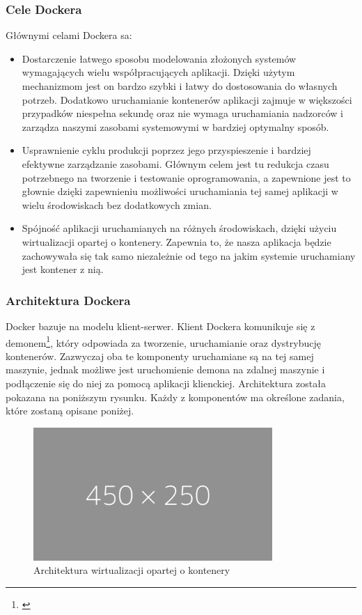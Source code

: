 \documentclass[12pt]{report}
\let\Oldsubsubsection\subsubsection
\renewcommand{\subsubsection}{\FloatBarrier\Oldsubsubsection}
\begin{document}
\subsubsection{Cele Dockera}
Głównymi celami Dockera sa:
\begin{itemize}
\item Dostarczenie łatwego sposobu modelowania złożonych systemów wymagających wielu współpracujących aplikacji. Dzięki użytym mechanizmom jest on bardzo szybki i łatwy do dostosowania do własnych potrzeb. Dodatkowo uruchamianie kontenerów aplikacji zajmuje w większości przypadków niespełna sekundę oraz nie wymaga uruchamiania nadzorców i zarządza naszymi zasobami systemowymi w bardziej optymalny sposób.

\item Usprawnienie cyklu produkcji poprzez jego przyspieszenie i bardziej efektywne zarządzanie zasobami. Głównym celem jest tu redukcja czasu potrzebnego na tworzenie i testowanie oprogramowania, a zapewnione jest to głownie dzięki zapewnieniu możliwości uruchamiania tej samej aplikacji w wielu środowiskach bez dodatkowych zmian.

\item Spójność aplikacji uruchamianych na różnych środowiskach, dzięki użyciu wirtualizacji opartej o kontenery. Zapewnia to, że nasza aplikacja będzie zachowywała się tak samo niezależnie od tego na jakim systemie uruchamiany jest kontener z nią.
\end{itemize}

\subsubsection{Architektura Dockera}
Docker bazuje na modelu klient-serwer. Klient Dockera komunikuje się z demonem\footnote{\cite{daemon}}, który odpowiada za tworzenie, uruchamianie oraz dystrybucję kontenerów. Zazwyczaj oba te komponenty uruchamiane są na tej samej maszynie, jednak możliwe jest uruchomienie demona na zdalnej maszynie i podłączenie się do niej za pomocą aplikacji klienckiej. Architektura została pokazana na poniższym rysunku. Każdy z komponentów ma określone zadania, które zostaną opisane poniżej.

\begin{figure}[h]
	\centering
	\includegraphics[width=0.81\textwidth]{images/placeholder-wide.png}
	\caption{Architektura wirtualizacji opartej o kontenery}
\end{figure}
\end{document}
